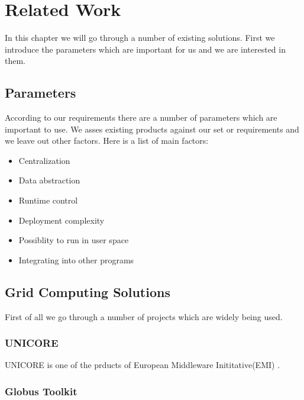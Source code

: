\chapter{Related Work}
\label{cha:literature}

In this chapter we will go through a number of existing solutions. First we introduce the parameters which are important for us and we are interested in them.

\section{Parameters}
According to our requirements there are a number of parameters which are important to use. We asses existing products
against our set or requirements and we leave out other factors. Here is a list of main factors:

\begin{itemize}
\item Centralization
\item Data abstraction
\item Runtime control
\item Deployment complexity
\item Possiblity to run in user space
\item Integrating into other programs
\end{itemize}

\section{Grid Computing Solutions}
First of all we go through a number of projects which are widely being used.
\subsection{UNICORE}
UNICORE is one of the prducts of European Middleware Inititative(EMI) \cite{EMI}.
\subsection{Globus Toolkit}
